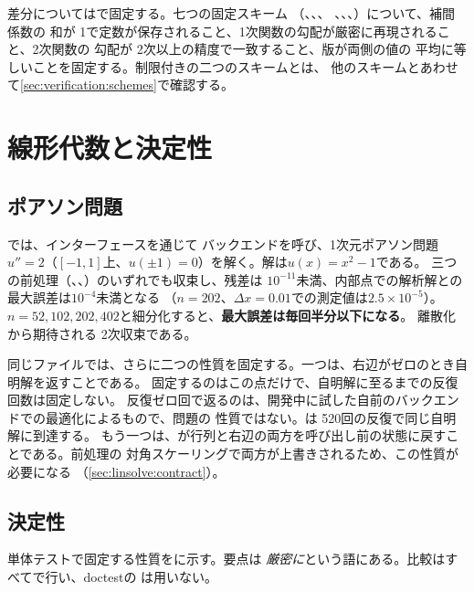 差分についてはで固定する。七つの固定スキーム
（、、、
、、、）について、補間係数の
和が 1で定数が保存されること、1次関数の勾配が厳密に再現されること、2次関数の
勾配が 2次以上の精度で一致すること、版が両側の値の
平均に等しいことを固定する。制限付きの二つのスキームとは、
他のスキームとあわせて\cref{sec:verification:schemes}で確認する。

\section{線形代数と決定性}
\label{sec:verification:linalg}

\subsection{ポアソン問題}

では、インターフェースを通じて
バックエンドを呼び、1次元ポアソン問題
$u'' = 2$（$[-1, 1]$上、$u(\pm1) = 0$）を解く。解は$u(x) = x^{2} - 1$である。
三つの前処理（、、）のいずれでも収束し、残差は
$10^{-11}$未満、内部点での解析解との最大誤差は$10^{-4}$未満となる
（$n = 202$、$\Delta x = 0.01$での測定値は$2.5\times10^{-5}$）。
$n = 52, 102, 202, 402$と細分化すると、\textbf{最大誤差は毎回半分以下になる}。
離散化から期待される 2次収束である。

同じファイルでは、さらに二つの性質を固定する。一つは、右辺がゼロのとき自明解を返すことである。
固定するのはこの点だけで、自明解に至るまでの反復回数は固定しない。
反復ゼロ回で返るのは、開発中に試した自前のバックエンドでの最適化によるもので、問題の
性質ではない。は 520回の反復で同じ自明解に到達する。
もう一つは、が行列と右辺の両方を呼び出し前の状態に戻すことである。前処理の
対角スケーリングで両方が上書きされるため、この性質が必要になる
（\cref{sec:linsolve:contract}）。

\subsection{決定性}

単体テストで固定する性質をに示す。要点は
\emph{厳密に}という語にある。比較はすべて\code{==}で行い、doctestの
は用いない。

